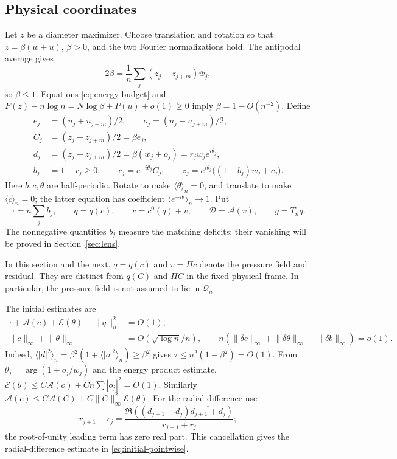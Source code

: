 \documentclass[11pt,reqno]{amsart}
\numberwithin{equation}{section}
\theoremstyle{definition}
\theoremstyle{remark}
\newcommand{\A}{\mathcal A}
\newcommand{\E}{\mathcal E}
\newcommand{\av}[1]{\langle #1\rangle_n}
\newcommand{\norm}[1]{\lVert #1\rVert}
\newcommand{\dd}{\delta}
\begin{document}
\subsection{Physical coordinates}
Let $z$ be a diameter maximizer. Choose translation and rotation so that $z=\beta(w+u)$, $\beta>0$, and the two Fourier normalizations hold. The antipodal average gives
\[
 2\beta=\frac1n\sum_j(z_j-z_{j+m})\overline w_j,
\]
so $\beta\le1$. Equations \eqref{eq:energy-budget} and $F(z)-n\log n=N\log\beta+P(u)+o(1)\ge0$ imply $\beta=1-O(n^{-2})$.
Define
\begin{equation}\label{eq:physical-decomposition}
 \begin{split}
 e_j&=(u_j+u_{j+m})/2,\qquad o_j=(u_j-u_{j+m})/2,\\
 C_j&=(z_j+z_{j+m})/2=\beta e_j,\\
 d_j&=(z_j-z_{j+m})/2=\beta(w_j+o_j)=r_jw_je^{i\theta_j},\\
 b_j&=1-r_j\ge0,\qquad c_j=e^{-i\theta_j}C_j,\qquad
 z_j=e^{i\theta_j}\bigl((1-b_j)w_j+c_j\bigr).
 \end{split}
\end{equation}
Here $b,c,\theta$ are half-periodic. Rotate to make $\av\theta=0$, and translate to make $\av c=0$; the latter equation has coefficient $\av{e^{-i\theta}}\to1$. Put
\begin{equation}\label{eq:pressure-variables}
 \tau=n\sum_jb_j,\qquad q=q(c),\qquad
 c=c^0(q)+v,\qquad \mathscr D=\A(v),\qquad g=T_nq.
\end{equation}
The nonnegative quantities $b_j$ measure the matching deficits; their vanishing will be proved in Section~\ref{sec:lens}.

In this section and the next, $q=q(c)$ and $v=\Pi c$ denote the pressure field and residual. They are distinct from $q(C)$ and $\Pi C$ in the fixed physical frame. In particular, the pressure field is not assumed to lie in $\mathcal Q_n$.

The initial estimates are
\begin{align}
 \tau+\A(c)+\E(\theta)+\norm q_n^2&=O(1),\label{eq:initial-pressure}\\
 \norm c_\infty+\norm\theta_\infty&=O(\sqrt{\log n}/n),
 \qquad n(\norm{\dd c}_\infty+\norm{\dd\theta}_\infty+\norm{\dd b}_\infty)=o(1).
 \label{eq:initial-pointwise}
\end{align}
Indeed, $\av{|d|^2}=\beta^2(1+\av{|o|^2})\ge\beta^2$ gives $\tau\le n^2(1-\beta^2)=O(1)$. From $\theta_j=\arg(1+o_j/w_j)$ and the energy product estimate, $\E(\theta)\le C\A(o)+Cn\sum|o_j|^2=O(1)$. Similarly $\A(c)\le C\A(C)+C\norm C_\infty^2\E(\theta)$. For the radial difference use
\[
 r_{j+1}-r_j=
 \frac{\Re((d_{j+1}-d_j)\overline{d_{j+1}+d_j})}{r_{j+1}+r_j};
\]
the root-of-unity leading term has zero real part. This cancellation gives the radial-difference estimate in \eqref{eq:initial-pointwise}.
\end{document}
